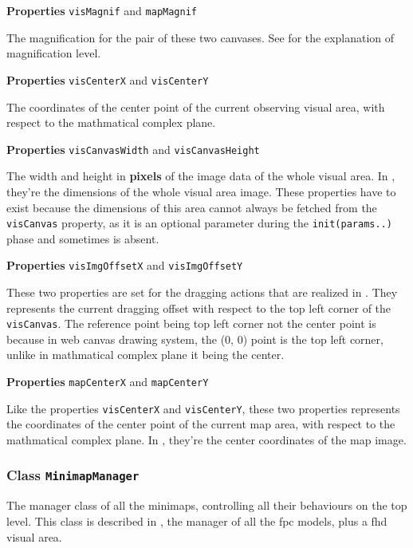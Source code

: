 \textbf{Properties} \texttt{visMagnif} and \texttt{mapMagnif}

The magnification for the pair of these two canvases. See  for the explanation of magnification level.

\textbf{Properties} \texttt{visCenterX} and \texttt{visCenterY}

The coordinates of the center point of the current observing visual area, with respect to the mathmatical complex plane.

\textbf{Properties} \texttt{visCanvasWidth} and \texttt{visCanvasHeight}

The width and height in \textbf{pixels} of the image data of the whole visual area. In , they're the dimensions of the whole visual area image. These properties have to exist because the dimensions of this area cannot always be fetched from the \texttt{visCanvas} property, as it is an optional parameter during the \texttt{init(params..)} phase and sometimes is absent.

\textbf{Properties} \texttt{visImgOffsetX} and \texttt{visImgOffsetY}

These two properties are set for the dragging actions that are realized in . They represents the current dragging offset with respect to the top left corner of the \texttt{visCanvas}. The reference point being top left corner not the center point is because in web canvas drawing system, the (0, 0) point is the top left corner, unlike in mathmatical complex plane it being the center.

\textbf{Properties} \texttt{mapCenterX} and \texttt{mapCenterY}

Like the properties \texttt{visCenterX} and \texttt{visCenterY}, these two properties represents the coordinates of the center point of the current \gls{map} area, with respect to the mathmatical complex plane. In , they're the center coordinates of the \gls{map} image.

\subsubsection{Class \texttt{MinimapManager}}\label{chap4:minimapmanager}

The manager class of all the minimaps, controlling all their behaviours on the top level. This class is described in , the manager of all the \gls{fpc} models, plus a \gls{fhd} visual area.

